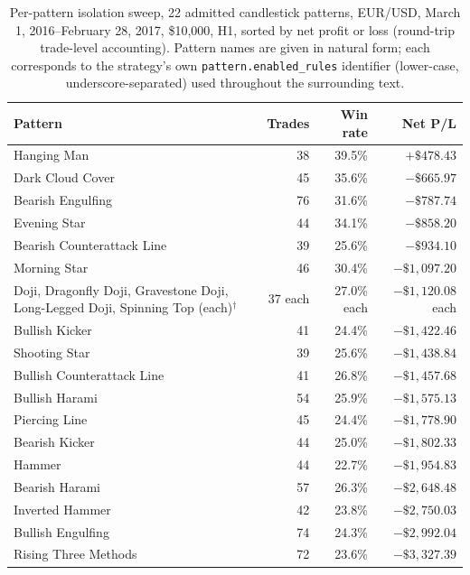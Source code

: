 \begin{table}[htbp]
\centering
\caption[Per-pattern isolation sweep for 22 candlestick patterns]{Per-pattern isolation sweep, 22 admitted candlestick patterns, EUR/USD, March 1, 2016--February 28, 2017, \$10,000, H1, sorted by net profit or loss (round-trip trade-level accounting). Pattern names are given in natural form; each corresponds to the strategy's own \texttt{pattern.enabled\_rules} identifier (lower-case, underscore-separated) used throughout the surrounding text.}
\label{tab:candles-per-pattern}
\small
\begin{tabular}{p{4.6cm}rrr}
\toprule
\textbf{Pattern} & \textbf{Trades} & \textbf{Win rate} & \textbf{Net P/L} \\
\midrule
Hanging Man & 38 & 39.5\% & $+\$478.43$ \\
Dark Cloud Cover & 45 & 35.6\% & $-\$665.97$ \\
Bearish Engulfing & 76 & 31.6\% & $-\$787.74$ \\
Evening Star & 44 & 34.1\% & $-\$858.20$ \\
Bearish Counterattack Line & 39 & 25.6\% & $-\$934.10$ \\
Morning Star & 46 & 30.4\% & $-\$1{,}097.20$ \\
Doji, Dragonfly Doji, Gravestone Doji, Long-Legged Doji, Spinning Top (each)$^\dagger$ & 37 each & 27.0\% each & $-\$1{,}120.08$ each \\
Bullish Kicker & 41 & 24.4\% & $-\$1{,}422.46$ \\
Shooting Star & 39 & 25.6\% & $-\$1{,}438.84$ \\
Bullish Counterattack Line & 41 & 26.8\% & $-\$1{,}457.68$ \\
Bullish Harami & 54 & 25.9\% & $-\$1{,}575.13$ \\
Piercing Line & 45 & 24.4\% & $-\$1{,}778.90$ \\
Bearish Kicker & 44 & 25.0\% & $-\$1{,}802.33$ \\
Hammer & 44 & 22.7\% & $-\$1{,}954.83$ \\
Bearish Harami & 57 & 26.3\% & $-\$2{,}648.48$ \\
Inverted Hammer & 42 & 23.8\% & $-\$2{,}750.03$ \\
Bullish Engulfing & 74 & 24.3\% & $-\$2{,}992.04$ \\
Rising Three Methods & 72 & 23.6\% & $-\$3{,}327.39$ \\
\bottomrule
\end{tabular}
\end{table}

